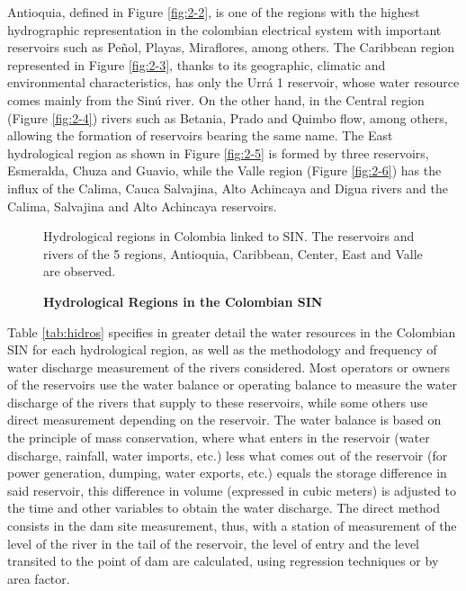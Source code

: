 \documentclass[12pt,halfline,a4paper]{ouparticle}
\begin{document}
Antioquia, defined in Figure \ref{fig:2-2}, is one of the regions with the highest hydrographic representation in the colombian electrical system with important reservoirs such as Peñol, Playas, Miraflores, among others. The Caribbean region represented in Figure \ref{fig:2-3}, thanks to its geographic, climatic and environmental characteristics, has only the Urrá 1 reservoir, whose water resource comes mainly from the Sinú river. On the other hand, in the Central region (Figure \ref{fig:2-4}) rivers such as Betania, Prado and Quimbo flow, among others, allowing the formation of reservoirs bearing the same name. The East hydrological region as shown in Figure \ref{fig:2-5} is formed by three reservoirs, Esmeralda, Chuza and Guavio, while the Valle region (Figure \ref{fig:2-6}) has the influx of the Calima, Cauca Salvajina, Alto Achincaya and Digua rivers and the Calima, Salvajina and Alto Achincaya reservoirs.

\begin{figure}[htbp]
	\centering
	\caption{\textbf{Hydrological Regions in the Colombian SIN}} \label{fig:2}
	\medskip
	\begin{minipage}{0.8\textwidth} 
		{\footnotesize{Hydrological regions in Colombia linked to SIN. The reservoirs and rivers of the 5 regions, Antioquia, Caribbean, Center, East and Valle are observed.\par}}
	\end{minipage}
\end{figure}

Table \ref{tab:hidros} specifies in greater detail the water resources in the Colombian SIN for each hydrological region, as well as the methodology and frequency of water discharge measurement of the rivers considered. Most operators or owners of the reservoirs use the water balance or operating balance to measure the water discharge of the rivers that supply to these reservoirs, while some others use direct measurement depending on the reservoir. The water balance is based on the principle of mass conservation, where what enters in the reservoir (water discharge, rainfall, water imports, etc.) less what comes out of the reservoir (for power generation, dumping, water exports, etc.) equals the storage difference in said reservoir, this difference in volume (expressed in cubic meters) is adjusted to the time and other variables to obtain the water discharge. The direct method consists in the dam site measurement, thus, with a station of measurement of the level of the river in the tail of the reservoir, the level of entry and the level transited to the point of dam are calculated, using regression techniques or by area factor.
\end{document}
